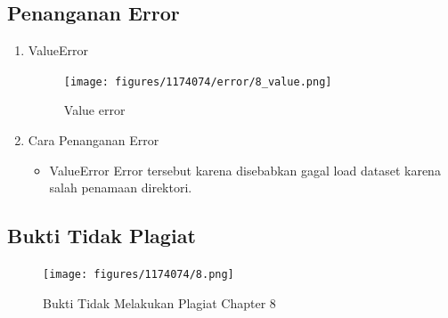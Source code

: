 \subsection{Penanganan Error}
\begin{enumerate}
    \item ValueError
    \begin{figure}[H]
		\texttt{[image: figures/1174074/error/8\_value.png]}
		\centering
		\caption{Value error}
    \end{figure}
    \item Cara Penanganan Error
    \begin{itemize}
        \item ValueError
        \hfill\break
		Error tersebut karena disebabkan gagal load dataset karena salah penamaan direktori.
    \end{itemize}
\end{enumerate}
\subsection{Bukti Tidak Plagiat}
\begin{figure}[H]
    \texttt{[image: figures/1174074/8.png]}
    \centering
    \caption{Bukti Tidak Melakukan Plagiat Chapter 8}
\end{figure}
